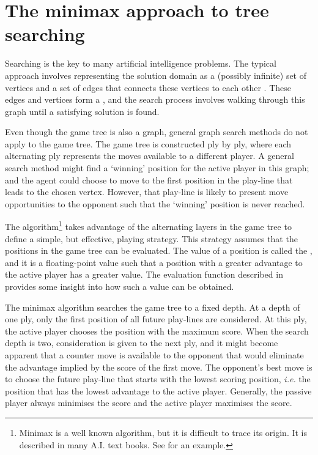 \section{The minimax approach to tree searching}
\label{sec:tree-minimax}
Searching is the key to many artificial intelligence problems. The typical approach involves representing the solution domain as a (possibly infinite) set of vertices and a set of edges that connects  these vertices to each other \cite{poole98,nilsson:principles}.  These edges and vertices form a , and the search process involves walking through this graph until a satisfying solution is found.  

Even though the game tree is also a graph, general graph search methods do not apply to the game tree. The game tree is constructed ply by ply, where each alternating ply represents the moves available to a different player.  A general search method might find a `winning' position for the active player in this graph; and the agent could choose to move to the first position in the play-line that leads to the chosen vertex. However, that  play-line is likely to present move opportunities to the opponent such that the `winning' position is never reached. 

The  algorithm\footnote{Minimax is a well known algorithm, but it is difficult to trace its origin.  It is described in many A.I. text books. See \cite{rich83} for an example.} takes advantage of the alternating layers in the game tree to define a simple, but effective, playing strategy. This strategy assumes that the positions in the game tree can be evaluated.  The value of a position is called the , and it is a floating-point value such that a position with a greater advantage to the active player has a greater value. The evaluation function described in  provides some insight into how such a value can be obtained.

The minimax algorithm searches the game tree to a fixed depth. At a depth of one ply, only the  first position of all future play-lines are considered.  At this ply, the active player chooses the position with the maximum score. When the search depth is two, consideration is given to the next ply, and it might become apparent that a counter move is available to the opponent that would eliminate the advantage implied by the score of the first move. The opponent's best move is to choose the future play-line that starts with the lowest scoring position, {\it i.e.} the position that has the lowest advantage to the active player.  Generally, the passive player always minimises the score and the active player maximises the score. 

